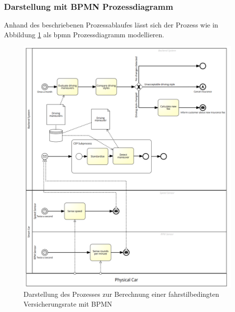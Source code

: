 \documentclass[a4paper, 12pt, twoside, headsepline=true]{scrartcl} %
\begin{document}
\subsubsection{Darstellung mit BPMN Prozessdiagramm}
Anhand des beschriebenen Prozessablaufes lässt sich der Prozess wie in Abbildung \ref{fig:bpmnprocess} als \ac{bpmn} Prozessdiagramm modellieren. 
\begin{figure}[H]
	\includegraphics[height=17 cm,keepaspectratio,center]{figures/BPMNProcess}
	\caption{Darstellung des Prozesses zur Berechnung einer fahrstilbedingten Versicherungsrate mit BPMN}
	\label{fig:bpmnprocess}
\end{figure} 
\end{document}
